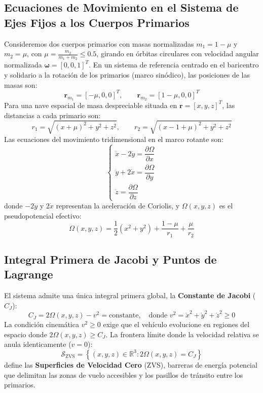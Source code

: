 \documentclass[11pt, a4paper]{article}
\begin{document}
	\subsection{Ecuaciones de Movimiento en el Sistema de Ejes Fijos a los Cuerpos Primarios}
	Consideremos dos cuerpos primarios con masas normalizadas $m_1 = 1-\mu$ y $m_2 = \mu$, con $\mu = \frac{m_2}{m_1+m_2} \le 0.5$, girando en órbitas circulares con velocidad angular normalizada $\boldsymbol{\omega} = [0, 0, 1]^T$. En un sistema de referencia centrado en el baricentro y solidario a la rotación de los primarios (marco sinódico), las posiciones de las masas son:
	\begin{equation}
		\mathbf{r}_{m_1} = [-\mu, 0, 0]^T, \qquad \mathbf{r}_{m_2} = [1-\mu, 0, 0]^T
	\end{equation}
	Para una nave espacial de masa despreciable situada en $\mathbf{r} = [x, y, z]^T$, las distancias a cada primario son:
	\begin{equation}
		r_1 = \sqrt{(x+\mu)^2 + y^2 + z^2}, \qquad r_2 = \sqrt{(x - 1 + \mu)^2 + y^2 + z^2}
	\end{equation}
	Las ecuaciones del movimiento tridimensional en el marco rotante son:
	\begin{equation}
		\begin{cases}
			\ddot{x} - 2\dot{y} = \dfrac{\partial \Omega}{\partial x} \\[0.5em]
			\ddot{y} + 2\dot{x} = \dfrac{\partial \Omega}{\partial y} \\[0.5em]
			\ddot{z} = \dfrac{\partial \Omega}{\partial z}
		\end{cases}
	\end{equation}
	donde $-2\dot{y}$ y $2\dot{x}$ representan la aceleración de Coriolis, y $\Omega(x, y, z)$ es el pseudopotencial efectivo:
	\begin{equation}
		\Omega(x, y, z) = \frac{1}{2}(x^2 + y^2) + \frac{1-\mu}{r_1} + \frac{\mu}{r_2}
	\end{equation}
	
	\subsection{Integral Primera de Jacobi y Puntos de Lagrange}
	El sistema admite una única integral primera global, la \textbf{Constante de Jacobi} ($C_J$):
	\begin{equation}
		C_J = 2\Omega(x, y, z) - v^2 = \text{constante}, \quad \text{donde } v^2 = \dot{x}^2 + \dot{y}^2 + \dot{z}^2 \ge 0
	\end{equation}
	La condición cinemática $v^2 \ge 0$ exige que el vehículo evolucione en regiones del espacio donde $2\Omega(x, y, z) \ge C_J$. La frontera límite donde la velocidad relativa se anula identicamente ($v = 0$):
	\begin{equation}
		\mathcal{S}_{\text{ZVS}} = \left\{ (x, y, z) \in \mathbb{R}^3 : 2\Omega(x, y, z) = C_J \right\}
	\end{equation}
	define las \textbf{Superficies de Velocidad Cero} (ZVS), barreras de energía potencial que delimitan las zonas de vuelo accesibles y los pasillos de tránsito entre los primarios.
	
\end{document}
